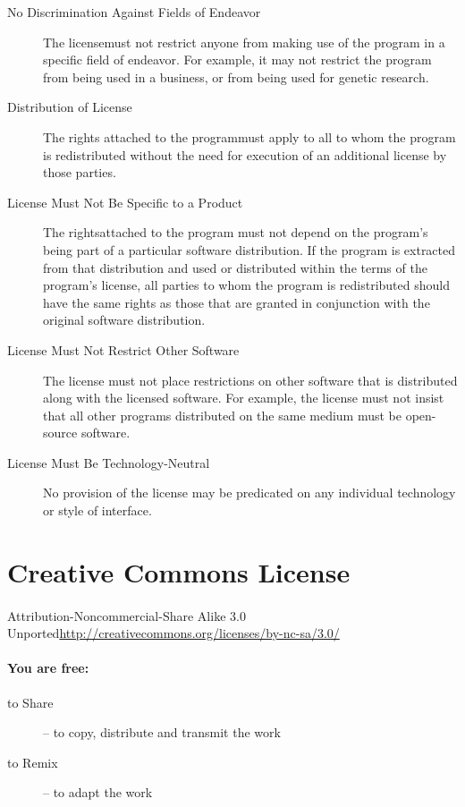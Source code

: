\documentclass[11pt,titlepage]{book}
\begin{document}
\begin{appendices}
\begin{description}
\item[No Discrimination Against Fields of Endeavor]{The license\linebreak must not restrict anyone from making use of the program in a specific field of endeavor. For example, it may not restrict the program from being used in a business, or from being used for genetic research.}
\item[Distribution of License]{The rights attached to the program\linebreak must apply to all to whom the program is redistributed without the need for execution of an additional license by those parties.}
\item[License Must Not Be Specific to a Product]{The rights\linebreak attached to the program must not depend on the program's being part of a particular software distribution. If the program is extracted from that distribution and used or distributed within the terms of the program's license, all parties to whom the program is redistributed should have the same rights as those that are granted in conjunction with the original software distribution.}
\item[License Must Not Restrict Other Software]{The license must not place restrictions on other software that is distributed along with the licensed software. For example, the license must not insist that all other programs distributed on the same medium must be open-source software.}
\item[License Must Be Technology-Neutral]{No provision of the license may be predicated on any individual technology or style of interface.}
\end{description}
\newpage
\section{Creative Commons License}
\paragraph{}Attribution-Noncommercial-Share Alike 3.0 Unported\linebreak\url{http://creativecommons.org/licenses/by-nc-sa/3.0/}
\paragraph{You are free:}
\begin{description}
\item[to Share]{-- to copy, distribute and transmit the work}
\item[to Remix]{-- to adapt the work}
\end{description}

\end{appendices}
\end{document}
